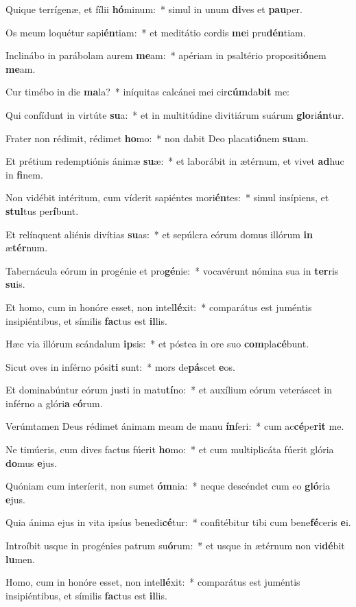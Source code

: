 \item Quique terrígenæ, et fílii \textbf{hó}minum:~* simul in unum \textbf{di}ves et \textbf{pau}per.
\item Os meum loquétur sapi\textbf{én}tiam:~* et meditátio cordis \textbf{me}i pru\textbf{dén}tiam.
\item Inclinábo in parábolam aurem \textbf{me}am:~* apériam in psaltério propositi\textbf{ó}nem \textbf{me}am.
\item Cur timébo in die \textbf{ma}la?~* iníquitas calcánei mei cir\textbf{cúm}da\textbf{bit} me:
\item Qui confídunt in virtúte \textbf{su}a:~* et in multitúdine divitiárum suárum \textbf{glo}ri\textbf{án}tur.
\item Frater non rédimit, rédimet \textbf{ho}mo:~* non dabit Deo placati\textbf{ó}nem \textbf{su}am.
\item Et prétium redemptiónis ánimæ \textbf{su}æ:~* et laborábit in ætérnum, et vivet \textbf{ad}huc in \textbf{fi}nem.
\item Non vidébit intéritum, cum víderit sapiéntes mori\textbf{én}tes:~* simul insípiens, et \textbf{stul}tus per\textbf{í}bunt.
\item Et relínquent aliénis divítias \textbf{su}as:~* et sepúlcra eórum domus illórum \textbf{in} æ\textbf{tér}num.
\item Tabernácula eórum in progénie et pro\textbf{gé}nie:~* vocavérunt nómina sua in \textbf{ter}ris \textbf{su}is.
\item Et homo, cum in honóre esset, non intel\textbf{lé}xit:~* comparátus est juméntis insipiéntibus, et símilis \textbf{fac}tus est \textbf{il}lis.
\item Hæc via illórum scándalum \textbf{ip}sis:~* et póstea in ore suo \textbf{com}pla\textbf{cé}bunt.
\item Sicut oves in inférno pósi\textbf{ti} sunt:~* mors de\textbf{pá}scet \textbf{e}os.
\item Et dominabúntur eórum justi in matu\textbf{tí}no:~* et auxílium eórum veteráscet in inférno a glóri\textbf{a} e\textbf{ó}rum.
\item Verúmtamen Deus rédimet ánimam meam de manu \textbf{ín}feri:~* cum ac\textbf{cé}pe\textbf{rit} me.
\item Ne timúeris, cum dives factus fúerit \textbf{ho}mo:~* et cum multiplicáta fúerit glória \textbf{do}mus \textbf{e}jus.
\item Quóniam cum interíerit, non sumet \textbf{óm}nia:~* neque descéndet cum eo \textbf{gló}ria \textbf{e}jus.
\item Quia ánima ejus in vita ipsíus benedi\textbf{cé}tur:~* confitébitur tibi cum bene\textbf{fé}ceris \textbf{e}i.
\item Introíbit usque in progénies patrum su\textbf{ó}rum:~* et usque in ætérnum non vi\textbf{dé}bit \textbf{lu}men.
\item Homo, cum in honóre esset, non intel\textbf{lé}xit:~* comparátus est juméntis insipiéntibus, et símilis \textbf{fac}tus est \textbf{il}lis.

